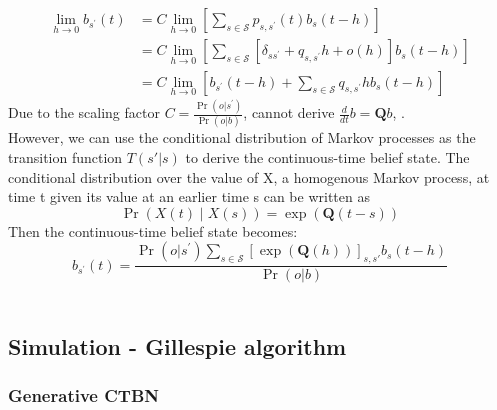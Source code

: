 \documentclass[]{article}
\begin{document}
	\begin{equation}
	\begin{aligned}
	\lim_{h\rightarrow 0} b_{s^{\prime}}(t) &= C \lim_{h\rightarrow 0}\left[  \sum_{s \in \mathcal{S}} p_{s, s^{\prime}}(t) b_{s}(t-h)\right]\\
	&= C \lim_{h\rightarrow 0}\left[  \sum_{s \in \mathcal{S}} \left[ \delta_{ss^{\prime}}+q_{s,s^{\prime}} h+o(h)\right]  b_{s}(t-h)\right]\\
	&= C \lim_{h\rightarrow 0}\left[ b_{s^{\prime}}(t-h) + \sum_{s \in \mathcal{S}} q_{s,s^{\prime}} h  b_{s}(t-h)\right]
	\end{aligned}
	\end{equation}
	Due to the scaling factor $ C =\frac{\operatorname{Pr}\left(o |s^{\prime}\right)}{\operatorname{Pr}(o | b)} $, cannot derive $ \frac{d}{dt} b = \textbf{Q}b$, .\\
	However, we can use the conditional distribution of Markov processes as the transition function $ T(s'|s) $ to derive the continuous-time belief state. The conditional distribution over the value of X, a homogenous Markov process, at time t given its value at an earlier time s can be written as 
	\begin{equation}
	\operatorname{Pr}\left(X(t) \mid X(s)\right) = \exp(\textbf{Q}(t-s))
	\end{equation}
	Then the continuous-time belief state becomes:
	\begin{equation}
	b_{s^{\prime}}(t) =\frac{\operatorname{Pr}\left(o |s^{\prime}\right) \sum_{s \in \mathcal{S}}\left[ \exp(\textbf{Q}(h))\right]_{s,s'}  b_{s}(t-h)}{\operatorname{Pr}(o | b)}
	\end{equation}\\
	
	\subsection{Simulation - Gillespie algorithm}
	\subsubsection{Generative CTBN}
	
\end{document}
